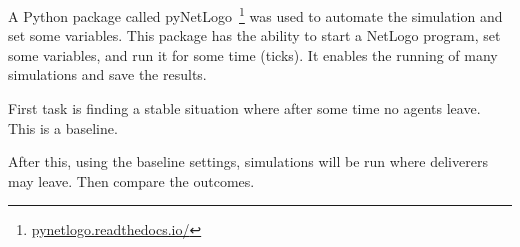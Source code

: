 A Python package called pyNetLogo~\footnote{\url{pynetlogo.readthedocs.io/}} was used to automate the simulation and set some variables.
This package has the ability to start a NetLogo program, set some variables, and run it for some time (ticks).
It enables the running of many simulations and save the results.

First task is finding a stable situation where after some time no agents leave.
This is a baseline.

After this, using the baseline settings, simulations will be run where deliverers may leave.
Then compare the outcomes.
















